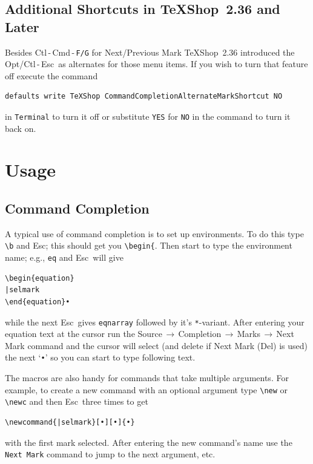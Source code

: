 \documentclass[11pt]{article}
\newcommand{\optkey}{\textsf{Opt}}
\newcommand{\ctlkey}{\textsf{Ctl}}
\newcommand{\cmdkey}{\textsf{Cmd}}
\newcommand{\esckey}{\textsf{Esc}}
\newcommand{\mnu}[1]{\textsf{#1}}
\newcommand{\To}{\,\(\to\)\,}
\newcommand{\TS}{\textsf{\TeX Shop}}
\begin{document}
\subsection*{Additional Shortcuts in \TS\ 2.36 and Later}

Besides \ctlkey\,-\,\cmdkey\,-\,\texttt{F/G} for \mnu{Next/Previous Mark} \TS\ 2.36 introduced the \optkey/\ctlkey\,-\,\esckey\ as alternates for those menu items. If you wish to turn that feature off execute the command
\begin{verbatim}
defaults write TeXShop CommandCompletionAlternateMarkShortcut NO
\end{verbatim}
in \texttt{Terminal} to turn it off or substitute \texttt{YES} for \texttt{NO} in the command to turn it back on.

\section*{Usage}

\subsection*{Command Completion}

A typical use of command completion is to set up environments. To do this type \verb|\b| and \esckey; this should get you \verb|\begin{|. Then start to type the environment name; e.g., \verb|eq| and \esckey\ will give
\begin{verbatim}
\begin{equation}
|selmark
\end{equation}•
\end{verbatim}
while the next \esckey\ gives \texttt{eqnarray} followed by it's \texttt{*}-variant. After entering your equation text at the cursor run the \mnu{Source}\To\mnu{Completion}\To\mnu{Marks}\To\mnu{Next Mark} command and the cursor will select (and  delete if \mnu{Next Mark (Del)} is used) the next `\texttt{•}' so you can start to type following text.

The macros are also handy for commands that take multiple arguments. For example, to create a new command with an optional argument type \verb|\new| or \verb|\newc| and then \esckey\ three times to get
\begin{verbatim}
\newcommand{|selmark}[•][•]{•}
\end{verbatim}
with the first mark selected. After entering the new command's name use the \texttt{Next Mark} command to jump to the next argument, etc.
\end{document}
